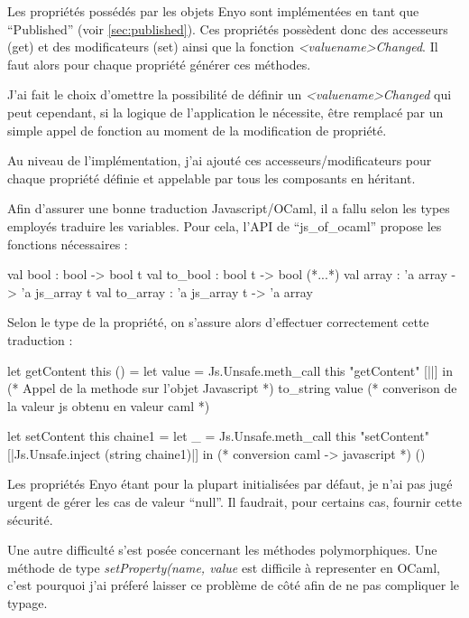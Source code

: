 \documentclass[11pt,a4paper]{report}
\begin{document}
Les propriétés possédés par les objets Enyo sont implémentées en tant que ``Published'' 
(voir \ref{sec:published}). Ces propriétés possèdent donc des accesseurs (get) et des modificateurs (set) ainsi
que la fonction \emph{<valuename>Changed}. Il faut alors pour chaque propriété générer ces méthodes.

J'ai fait le choix d'omettre la possibilité de définir un \emph{<valuename>Changed} qui peut cependant,
si la logique de l'application le nécessite, être remplacé par un simple appel de fonction au moment
de la modification de propriété.

Au niveau de l'implémentation, j'ai ajouté ces accesseurs/modificateurs pour chaque propriété définie 
et appelable par tous les composants en héritant.

Afin d'assurer une bonne traduction Javascript/OCaml, il a fallu selon les types employés traduire
les variables. Pour cela, l'API de ``js\_of\_ocaml'' propose les fonctions nécessaires :

\begin{OCaml}
  val bool : bool -> bool t
  val to_bool : bool t -> bool
  (*...*)
  val array : 'a array -> 'a js_array t
  val to_array : 'a js_array t -> 'a array
\end{OCaml}

Selon le type de la propriété, on s'assure alors d'effectuer correctement cette traduction :

\begin{OCaml}
  let getContent this () =
    let value = Js.Unsafe.meth_call 
                     this 
                     "getContent" 
                     [||] in (* Appel de la methode sur l'objet Javascript *)
    to_string value (* converison de la valeur js obtenu en valeur caml *)
\end{OCaml}
\clearpage %
\begin{OCaml}
  let setContent this chaine1 =
    let _ = Js.Unsafe.meth_call 
                this 
                "setContent" 
                [|Js.Unsafe.inject (string chaine1)|] in (* conversion caml -> javascript *)
    ()
\end{OCaml}

Les propriétés Enyo étant pour la plupart initialisées par défaut, je n'ai pas jugé urgent
de gérer les cas de valeur ``null''. Il faudrait, pour certains cas, fournir cette sécurité.\medskip

Une autre difficulté s'est posée concernant les méthodes polymorphiques. Une méthode de type
\emph{setProperty(name, value} est difficile à representer en OCaml, c'est pourquoi j'ai préferé
laisser ce problème de côté afin de ne pas compliquer le typage.
\end{document}
